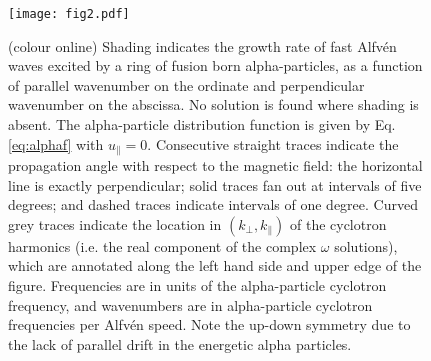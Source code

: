 \documentclass[12pt]{iopart}
\begin{document}
\begin{figure}[ht!]
    \raggedleft
\texttt{[image: fig2.pdf]}
    \caption{(colour online) Shading indicates the growth rate of fast
    Alfv{\'e}n waves excited by a ring of fusion born alpha-particles, as a
    function of parallel wavenumber on the ordinate and perpendicular wavenumber
    on the abscissa. No solution is found where shading is absent. The
    alpha-particle distribution function is given by Eq. \ref{eq:alphaf} with
    $u_{\parallel} = 0$. Consecutive straight traces indicate the propagation
    angle with respect to the magnetic field: the horizontal line is exactly
    perpendicular; solid traces fan out at intervals of five degrees; and dashed
    traces indicate intervals of one degree. Curved grey traces indicate the
    location in $(k_\perp, k_\parallel)$ of the cyclotron harmonics (i.e. the
    real component of the complex $\omega$ solutions), which are annotated along
    the left hand side and upper edge of the figure. Frequencies are in units of
    the alpha-particle cyclotron frequency, and wavenumbers are in
    alpha-particle cyclotron frequencies per Alfv{\'e}n speed. Note the up-down
    symmetry due to the lack of parallel drift in the energetic alpha
    particles.}
    \label{fig:2D_imag_zeropitch}
\end{figure}
\end{document}
